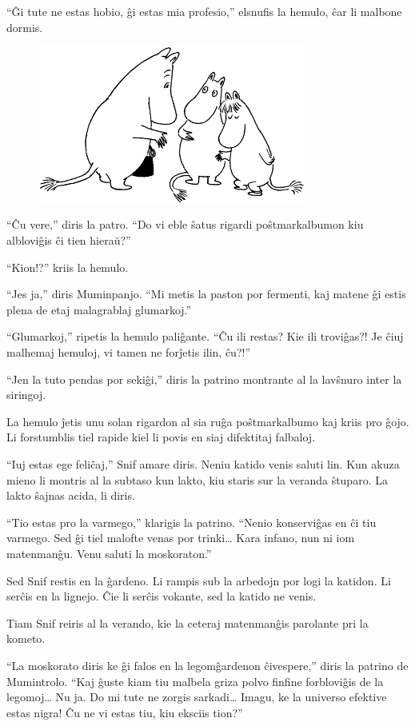 ``Ĝi tute ne estas hobio, ĝi estas mia profesio,'' elsnufis la hemulo, ĉar li malbone dormis.

\begin{figure}[htbp]
\centering
\includegraphics[width=250pt,height=146pt]{9-2.png}
\caption{}
\label{9-2}
\end{figure}

``Ĉu vere,'' diris la patro. ``Do vi eble ŝatus rigardi poŝtmarkalbumon kiu albloviĝis ĉi tien hieraŭ?''

``Kion!?'' kriis la hemulo.

``Jes ja,'' diris Muminpanjo. ``Mi metis la paston por fermenti, kaj matene ĝi estis plena de etaj malagrablaj glumarkoj.''

``Glumarkoj,'' ripetis la hemulo paliĝante. ``Ĉu ili restas? Kie ili troviĝas?! Je ĉiuj malhemaj hemuloj, vi tamen ne forĵetis ilin, ĉu?!''

``Jen la tuto pendas por sekiĝi,'' diris la patrino montrante al la lavŝnuro inter la siringoj.

La hemulo ĵetis unu solan rigardon al sia ruĝa poŝtmarkalbumo kaj kriis pro ĝojo. Li forstumblis tiel rapide kiel li povis en siaj difektitaj falbaloj.

``Iuj estas ege feliĉaj,'' Snif amare diris. Neniu katido venis saluti lin. Kun akuza mieno li montris al la subtaso kun lakto, kiu staris sur la veranda ŝtuparo. La lakto ŝajnas acida, li diris.

``Tio estas pro la varmego,'' klarigis la patrino. ``Nenio konserviĝas en ĉi tiu varmego. Sed ĝi tiel malofte venas por trinki{\ldots} Kara infano, nun ni iom matenmanĝu. Venu saluti la moskoraton.''

Sed Snif restis en la ĝardeno. Li rampis sub la arbedojn por logi la katidon. Li serĉis en la lignejo. Ĉie li serĉis vokante, sed la katido ne venis.

Tiam Snif reiris al la verando, kie la ceteraj matenmanĝis parolante pri la kometo.

``La moskorato diris ke ĝi falos en la legomĝardenon ĉivespere,'' diris la patrino de Mumintrolo. ``Kaj ĝuste kiam tiu malbela griza polvo finfine forbloviĝis de la legomoj{\ldots} Nu ja. Do mi tute ne zorgis sarkadi{\ldots} Imagu, ke la universo efektive estas nigra! Ĉu ne vi estas tiu, kiu eksciis tion?''

